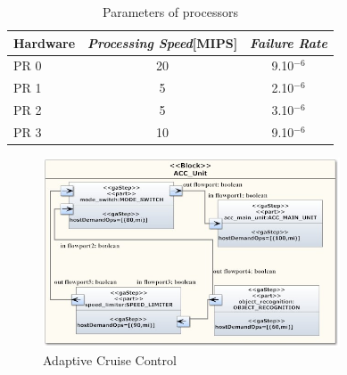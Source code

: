 \documentclass[3p,times,procedia,authoryear,round]{elsarticle}
\begin{document}
\begin{table}
	\begin{center}
		
		\begin{tabular}{ l   c   c }
			
			\hline
Hardware &  \emph{Processing Speed}[MIPS]  & \emph{Failure Rate} \\ 
			\hline
PR 0 & 20                 & 9.10$^{-6}$       \\
PR 1 & 5                   & 2.10$^{-6}$           \\				
PR 2 &  5                   & 3.10$^{-6}$   \\
PR 3 &  10                & 9.10$^{-6}$  \\		   			
			\hline	
		\end{tabular}
		\normalsize
	\end{center}
	\caption{Parameters of processors}
	\label{parameters1}
\end{table}







\begin{figure}[!htb]
	\centering

		\centering
		\includegraphics[width=250pt]{SwPlatformACC.jpg}
		\caption{Adaptive Cruise Control  }
		\label{comp1}

\end{figure}
\end{document}
